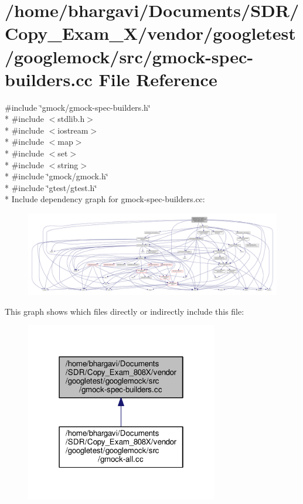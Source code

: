 \hypertarget{gmock-spec-builders_8cc}{}\section{/home/bhargavi/\+Documents/\+S\+D\+R/\+Copy\+\_\+\+Exam\+\_\+X/vendor/googletest/googlemock/src/gmock-\/spec-\/builders.cc File Reference}
\label{gmock-spec-builders_8cc}
{\ttfamily \#include \char`\"{}gmock/gmock-\/spec-\/builders.\+h\char`\"{}}\\*
{\ttfamily \#include $<$stdlib.\+h$>$}\\*
{\ttfamily \#include $<$iostream$>$}\\*
{\ttfamily \#include $<$map$>$}\\*
{\ttfamily \#include $<$set$>$}\\*
{\ttfamily \#include $<$string$>$}\\*
{\ttfamily \#include \char`\"{}gmock/gmock.\+h\char`\"{}}\\*
{\ttfamily \#include \char`\"{}gtest/gtest.\+h\char`\"{}}\\*
Include dependency graph for gmock-\/spec-\/builders.cc\+:
\nopagebreak
\begin{figure}[H]
\begin{center}
\leavevmode
\includegraphics[width=350pt]{gmock-spec-builders_8cc__incl}
\end{center}
\end{figure}
This graph shows which files directly or indirectly include this file\+:
\nopagebreak
\begin{figure}[H]
\begin{center}
\leavevmode
\includegraphics[width=238pt]{gmock-spec-builders_8cc__dep__incl}
\end{center}
\end{figure}
